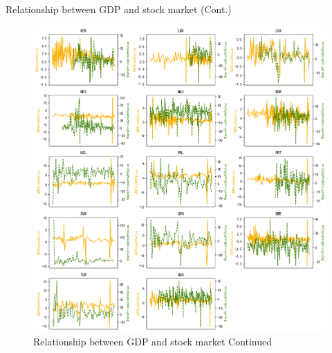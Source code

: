 \documentclass[10pt]{beamer}
\begin{document}
\begin{frame}{Relationship between GDP and stock market (Cont.)}
    \begin{figure}[htp]
    \centering
    \includegraphics[scale=0.3]{"OECD2"}
    \caption{Relationship between GDP and stock market Continued}
    \label{OECD Lines 2}
    \end{figure}
\end{frame}
\end{document}
